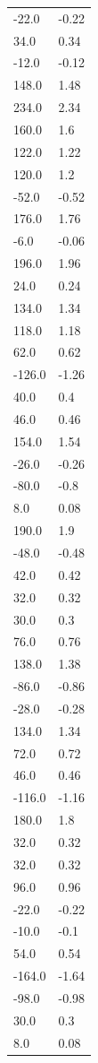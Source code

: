 \begin{longtable}{ll}
-22.0 & -0.22 \\
34.0 & 0.34 \\
-12.0 & -0.12 \\
148.0 & 1.48 \\
234.0 & 2.34 \\
160.0 & 1.6 \\
122.0 & 1.22 \\
120.0 & 1.2 \\
-52.0 & -0.52 \\
176.0 & 1.76 \\
-6.0 & -0.06 \\
196.0 & 1.96 \\
24.0 & 0.24 \\
134.0 & 1.34 \\
118.0 & 1.18 \\
62.0 & 0.62 \\
-126.0 & -1.26 \\
40.0 & 0.4 \\
46.0 & 0.46 \\
154.0 & 1.54 \\
-26.0 & -0.26 \\
-80.0 & -0.8 \\
8.0 & 0.08 \\
190.0 & 1.9 \\
-48.0 & -0.48 \\
42.0 & 0.42 \\
32.0 & 0.32 \\
30.0 & 0.3 \\
76.0 & 0.76 \\
138.0 & 1.38 \\
-86.0 & -0.86 \\
-28.0 & -0.28 \\
134.0 & 1.34 \\
72.0 & 0.72 \\
46.0 & 0.46 \\
-116.0 & -1.16 \\
180.0 & 1.8 \\
32.0 & 0.32 \\
32.0 & 0.32 \\
96.0 & 0.96 \\
-22.0 & -0.22 \\
-10.0 & -0.1 \\
54.0 & 0.54 \\
-164.0 & -1.64 \\
-98.0 & -0.98 \\
30.0 & 0.3 \\
8.0 & 0.08 \\

\end{longtable}
